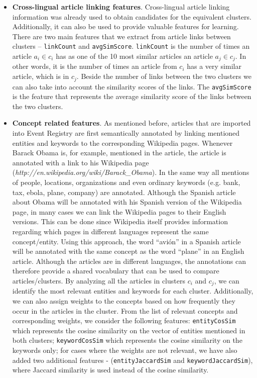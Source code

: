 \documentclass[twoside,11pt]{article}
\begin{document}
\begin{itemize}
\item {\bf Cross-lingual article linking features}. Cross-lingual article linking information was already used to obtain candidates for the equivalent clusters. Additionally, it can also be used to provide valuable  features for learning. There are two main features that we extract from article links between clusters -- \texttt{linkCount} and \texttt{avgSimScore}. \texttt{linkCount} is the number of times an article $a_i \in c_i$ has as one of the 10 most similar articles an article $a_j \in c_j$. In other words, it is the number of times an article from $c_i$ has a very similar article, which is in $c_j$. Beside the number of links between the two clusters we can also take into account the similarity scores of the links. The \texttt{avgSimScore} is the feature that represents the average similarity score of the links between the two clusters.

\item {\bf Concept related features}. As mentioned before, articles that are imported into Event Registry are first semantically annotated by linking mentioned entities and keywords to the corresponding Wikipedia pages. Whenever Barack Obama is, for example, mentioned in the article, the article is annotated with a link to his Wikipedia page (\emph{http://en.wikipedia.org/wiki/Barack\_Obama}). In the same way all mentions of people, locations, organizations and even ordinary keywords (e.g. bank, tax, ebola, plane, company) are annotated. Although the Spanish article about Obama will be annotated with his Spanish version of the Wikipedia page, in many cases we can link the Wikipedia pages to their English versions. This can be done since Wikipedia itself provides information regarding which pages in different languages represent the same concept/entity. Using this approach, the word ``avi\'on'' in a Spanish article will be annotated with the same concept as the word ``plane'' in an English article. Although the articles are in different languages, the annotations can therefore provide a shared vocabulary that can be used to compare articles/clusters. By analyzing all the articles in clusters $c_i$ and $c_j$, we can identify the most relevant entities and keywords for each cluster. Additionally, we can also assign weights to the concepts based on how frequently they occur in the articles in the cluster. From the list of relevant concepts and corresponding weights, we consider the following features: \texttt{entityCosSim} which represents the cosine similarity on the vector of entities mentioned in both clusters; \texttt{keywordCosSim} which represents the cosine similarity on the keywords only; for cases where the weights are not relevant, we have also added two additional features - (\texttt{entityJaccardSim} and \texttt{keywordJaccardSim}), where Jaccard similarity is used instead of the cosine similarity.


\end{itemize}
\end{document}
